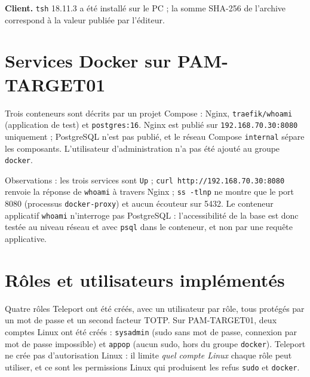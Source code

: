 \documentclass[11pt,a4paper]{report}
\begin{document}
\textbf{Client.} \texttt{tsh} 18.11.3 a été installé sur le PC ; la somme SHA-256 de l'archive correspond à la valeur publiée par l'éditeur.

\section{Services Docker sur PAM-TARGET01}
Trois conteneurs sont décrits par un projet Compose : Nginx, \texttt{traefik/whoami} (application de test) et \texttt{postgres:16}. Nginx est publié sur \texttt{192.168.70.30:8080} uniquement ; PostgreSQL n'est pas publié, et le réseau Compose \texttt{internal} sépare les composants. L'utilisateur d'administration n'a pas été ajouté au groupe \texttt{docker}.

Observations : les trois services sont \texttt{Up} ; \texttt{curl http://192.168.70.30:8080} renvoie la réponse de \texttt{whoami} à travers Nginx ; \texttt{ss -tlnp} ne montre que le port 8080 (processus \texttt{docker-proxy}) et aucun écouteur sur 5432. Le conteneur applicatif \texttt{whoami} n'interroge pas PostgreSQL : l'accessibilité de la base est donc testée au niveau réseau et avec \texttt{psql} dans le conteneur, et non par une requête applicative.

\section{Rôles et utilisateurs implémentés}\label{sec:roles-impl}
Quatre rôles Teleport ont été créés, avec un utilisateur par rôle, tous protégés par un mot de passe et un second facteur TOTP. Sur PAM-TARGET01, deux comptes Linux ont été créés : \texttt{sysadmin} (sudo sans mot de passe, connexion par mot de passe impossible) et \texttt{appop} (aucun sudo, hors du groupe \texttt{docker}). Teleport ne crée pas d'autorisation Linux : il limite \emph{quel compte Linux} chaque rôle peut utiliser, et ce sont les permissions Linux qui produisent les refus \texttt{sudo} et \texttt{docker}.
\end{document}
